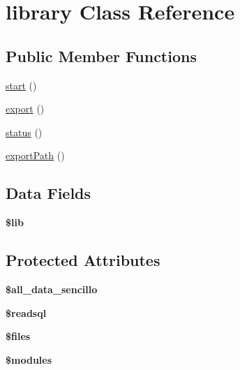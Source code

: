 \hypertarget{classlibrary}{\section{library Class Reference}
\label{classlibrary}
}
\subsection*{Public Member Functions}
\begin{DoxyCompactItemize}
\item 
\hyperlink{classlibrary_af8fa59992209e36dccb3eefb0f75531f}{start} ()
\item 
\hyperlink{classlibrary_a06412eb3b5af8cd7d978ac6eab667fbf}{export} ()
\item 
\hyperlink{classlibrary_a19e49aea71e41a8bd6076bc45169e4a3}{status} ()
\item 
\hyperlink{classlibrary_a2e30710ad967fb842b8cc42452bb4e5e}{export\-Path} ()
\end{DoxyCompactItemize}
\subsection*{Data Fields}
\begin{DoxyCompactItemize}
\item 
\hypertarget{classlibrary_a430f5ed50a4c2f3d6ddee6b54bc97eaa}{{\bfseries \$lib}}\label{classlibrary_a430f5ed50a4c2f3d6ddee6b54bc97eaa}

\end{DoxyCompactItemize}
\subsection*{Protected Attributes}
\begin{DoxyCompactItemize}
\item 
\hypertarget{classlibrary_ad2203e5674ffbd18d3fdbcf2cac19a38}{{\bfseries \$all\-\_\-data\-\_\-sencillo}}\label{classlibrary_ad2203e5674ffbd18d3fdbcf2cac19a38}

\item 
\hypertarget{classlibrary_aa1dfa8c07233f1a9171882cc98fd0e2f}{{\bfseries \$readsql}}\label{classlibrary_aa1dfa8c07233f1a9171882cc98fd0e2f}

\item 
\hypertarget{classlibrary_a9590b15215a21e9b42eb546aeef79704}{{\bfseries \$files}}\label{classlibrary_a9590b15215a21e9b42eb546aeef79704}

\item 
\hypertarget{classlibrary_a19e625c76c6796e995f33d323ee3aa84}{{\bfseries \$modules}}\label{classlibrary_a19e625c76c6796e995f33d323ee3aa84}

\end{DoxyCompactItemize}



